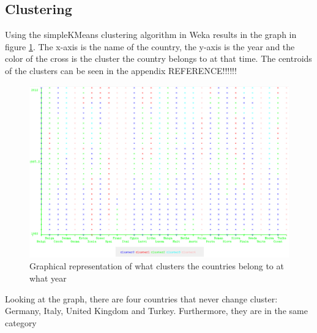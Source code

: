 \subsection{Clustering}
\label{Res_Clu}

Using the simpleKMeans clustering algorithm in Weka results in the graph in figure \ref{fig:clusters}. The x-axis is the name of the country, the y-axis is the year and the color of the cross is the cluster the country belongs to at that time. The centroids of the clusters can be seen in the appendix REFERENCE!!!!!!

\begin{figure}[h!]
  \centering
\includegraphics[width=\textwidth]{Appendix/Images/kMeans}
\caption{Graphical representation of what clusters the countries belong to at what year}
\label{fig:clusters}
\end{figure}

Looking at the graph, there are four countries that never change cluster: Germany, Italy, United Kingdom and Turkey. Furthermore, they are in the same category